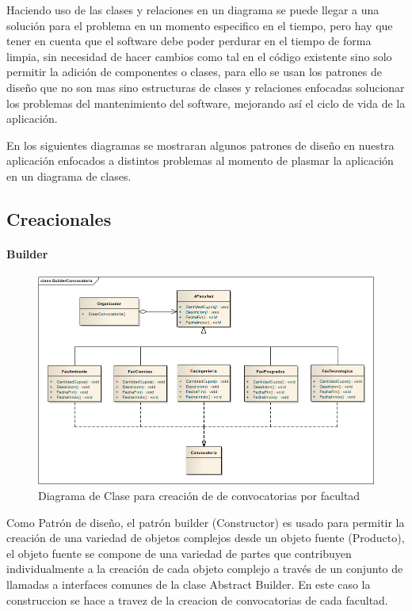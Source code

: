 Haciendo uso de las clases y relaciones en un diagrama se puede llegar a una solución para el problema en un momento especifico en el tiempo, pero hay que tener en cuenta que el software debe poder perdurar en el tiempo de forma limpia, sin necesidad de hacer cambios como tal en el código existente sino solo permitir la adición de componentes o clases, para ello se usan los patrones de diseño que no son mas sino estructuras de clases y relaciones enfocadas solucionar los problemas del mantenimiento del software, mejorando así el ciclo de vida de la aplicación.

En los siguientes diagramas se mostraran algunos patrones de diseño en nuestra aplicación enfocados a distintos problemas al momento de plasmar la aplicación en un diagrama de clases.

\subsection{Creacionales}

\paragraph{Builder}
\begin{figure}[H]
	\centering
	\includegraphics[width=1\linewidth]{parte2/imgs/Patrones/BuilderConvocatoria}
	\caption[Diagrama de clases del patrón Builder]{Diagrama de Clase para creación de de convocatorias por facultad}
	\label{fig:fabricaAbstracta}
\end{figure}

Como Patrón de diseño, el patrón builder (Constructor) es usado para permitir la creación de una variedad de objetos complejos desde un objeto fuente (Producto), el objeto fuente se compone de una variedad de partes que contribuyen individualmente a la creación de cada objeto complejo a través de un conjunto de llamadas a interfaces comunes de la clase Abstract Builder. En este caso la construccion se hace a travez de la creacion de convocatorias de cada facultad.


